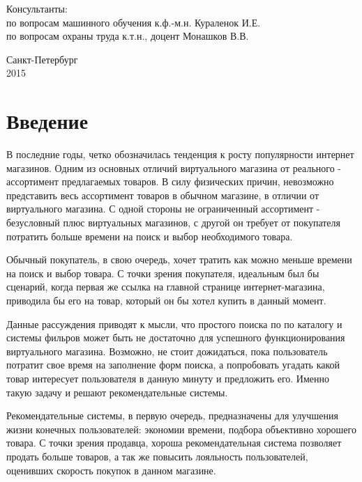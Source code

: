 \documentclass[12pt,a4paper]{report}
\begin{document}
\begin{titlepage}
\begin{center}
\begin{flushleft}
Консультанты:\\
\vspace*{0.3cm}
по вопросам машинного обучения  к.ф.-м.н. \hrulefill Кураленок И.Е.\\
\vspace*{0.3cm}
по вопросам охраны труда к.т.н., доцент \hrulefill Монашков В.В.\\
\end{flushleft}
\vspace{\fill}

\end{center}
\vfill
\begin{center}
{\large Санкт-Петербург \\ 2015}
\end {center}
\end{titlepage}

\tableofcontents %
\pagebreak
\chapter{Введение}
В последние годы, четко обозначилась тенденция к росту популярности интернет магазинов. Одним из основных отличий виртуального магазина от реального - ассортимент предлагаемых товаров. В силу физических причин, невозможно представить весь ассортимент товаров в обычном магазине, в отличии от виртуального магазина. С одной стороны не ограниченный ассортимент - безусловный плюс виртуальных магазинов, с другой он требует от покупателя потратить больше времени на поиск и выбор необходимого товара.

Обычный покупатель, в свою очередь, хочет тратить как можно меньше времени на поиск и выбор товара. С точки зрения покупателя, идеальным был бы сценарий, когда первая же ссылка на главной странице интернет-магазина, приводила бы его на товар, который он бы хотел купить в данный момент.

Данные рассуждения приводят к мысли, что простого поиска по по каталогу и системы фильров может быть не достаточно для успешного функционирования виртуального магазина. Возможно, не стоит дожидаться, пока пользователь потратит свое время на заполнение форм поиска, а попробовать угадать какой товар интересует пользователя в данную минуту и предложить его. Именно такую задачу и решают рекомендательные системы.

Рекомендательные системы, в первую очередь, предназначены для улучшения жизни конечных пользователей: экономии времени, подбора объективно хорошего товара. С точки зрения продавца, хороша рекомендательная система позволяет продать больше товаров, а так же повысить лояльность пользователей, оценивших скорость покупок в данном магазине.
\end{document}
